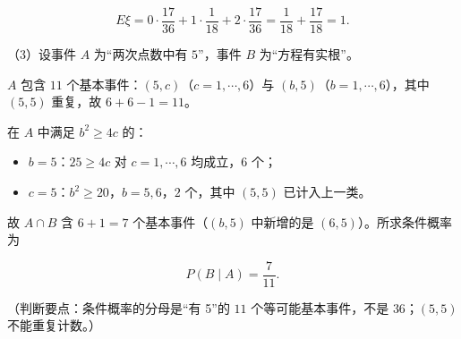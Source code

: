 \begin{answer}
\nopagebreak[4]
\[E\xi=0\cdot\frac{17}{36}+1\cdot\frac{1}{18}+2\cdot\frac{17}{36}=\frac{1}{18}+\frac{17}{18}=1.\]

（3）设事件 $A$ 为“两次点数中有 $5$”，事件 $B$ 为“方程有实根”。

$A$ 包含 $11$ 个基本事件：$(5,c)$（$c=1,\cdots,6$）与 $(b,5)$（$b=1,\cdots,6$），其中 $(5,5)$ 重复，故 $6+6-1=11$。

在 $A$ 中满足 $b^2\geqslant4c$ 的：

\begin{itemize}
\item $b=5$：$25\geqslant4c$ 对 $c=1,\cdots,6$ 均成立，$6$ 个；
\item $c=5$：$b^2\geqslant20$，$b=5,6$，$2$ 个，其中 $(5,5)$ 已计入上一类。
\end{itemize}

故 $A\cap B$ 含 $6+1=7$ 个基本事件（$(b,5)$ 中新增的是 $(6,5)$）。所求条件概率为

\nopagebreak[4]
\[P(B\mid A)=\frac{7}{11}.\]

（判断要点：条件概率的分母是“有 5”的 $11$ 个等可能基本事件，不是 $36$；$(5,5)$ 不能重复计数。）


\end{answer}
